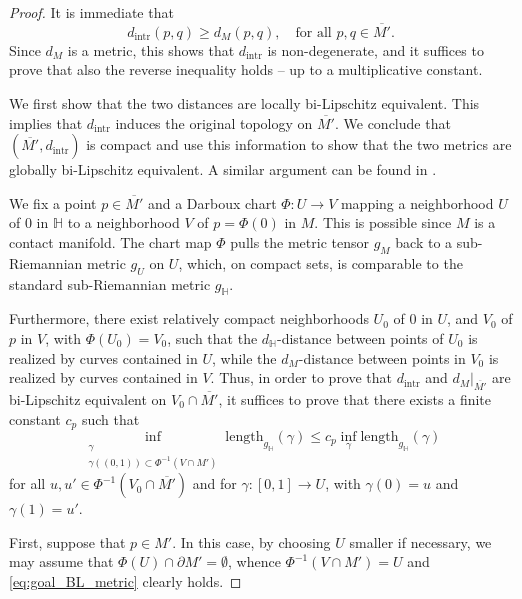 \documentclass[10pt,letterpaper]{amsart}
\theoremstyle{definition}
\numberwithin{thm}{subsection}
\numberwithin{equation}{section}
\begin{document}
\begin{proof}
It is immediate that
\begin{displaymath}
d_{\mathrm{intr}}(p,q)\geq d_M(p,q),\quad \text{for all }p,q\in \overline{M'}.
\end{displaymath}
Since $d_M$ is a metric, this shows that $d_{\mathrm{intr}}$ is non-degenerate, and it suffices to prove that also the reverse inequality holds -- up to a multiplicative constant.

We first show that the two distances are locally bi-Lipschitz equivalent. This implies that $d_{\mathrm{intr}}$ induces the original topology on $\overline{M'}$. We conclude that $(\overline{M'},d_{\mathrm{intr}})$ is compact and use this information to show that the two metrics are globally bi-Lipschitz equivalent. A similar argument can be found in \cite[\S3]{MR3226622}.

We fix a point $p\in \overline{M'}$ and a Darboux chart $\Phi: U \to V$ mapping a neighborhood $U$ of $0$ in ${\mathbb H}$ to a neighborhood $V$ of $p=\Phi(0)$ in $M$.
This is possible since $M$ is a contact manifold. The chart map $\Phi$ pulls the metric tensor $g_M$ back to a sub-Riemannian metric $g_U$ on $U$, which, on compact sets, is comparable to the standard sub-Riemannian metric $g_{\mathbb H}$.

Furthermore, there exist relatively compact neighborhoods $U_0$ of
$0$ in $U$, and $V_0$ of $p$ in $V$, with $\Phi(U_0)=V_0$, such
that the $d_{\mathbb H}$-distance between points of $U_0$ is
realized by curves contained in $U$, while the $d_M$-distance
between points in $V_0$ is realized by curves contained in $V$.
Thus, in order to prove that $d_{\mathrm{intr}}$ and
$d_M|_{\overline{M'}}$ are bi-Lipschitz equivalent on
$V_0\cap \overline{M'}$, it suffices to prove that there exists a
finite constant $c_p$ such that
\begin{equation}\label{eq:goal_BL_metric}
\inf_{\substack{\gamma \\ \gamma((0,1)) \subset \Phi^{-1}(V\cap
M')}} \mathrm{length}_{g_{\mathbb H}}(\gamma) \leq c_p
\inf_{\gamma} \mathrm{length}_{g_{\mathbb H}}(\gamma)
\end{equation}
for all $u,u'\in  \Phi^{-1}(V_0 \cap \overline{M'})$ and for
$\gamma:[0,1] \to U$, with $\gamma(0)=u$ and $\gamma(1)=u'$.

First, suppose that $p \in M'$. In this case, by choosing $U$
smaller if necessary, we may assume that $\Phi(U) \cap \partial M'
= \emptyset$, whence $\Phi^{-1}( V\cap M')= U$ and
\eqref{eq:goal_BL_metric} clearly holds.


\end{proof}
\end{document}
